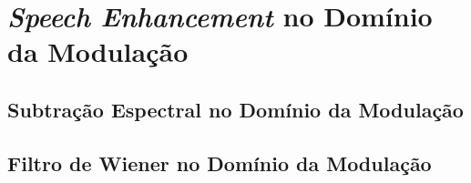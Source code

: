 \section{\textit{Speech Enhancement} no Domínio da Modulação}
\subsection{Subtração Espectral no Domínio da Modulação}

    


\subsection{Filtro de Wiener no Domínio da Modulação}